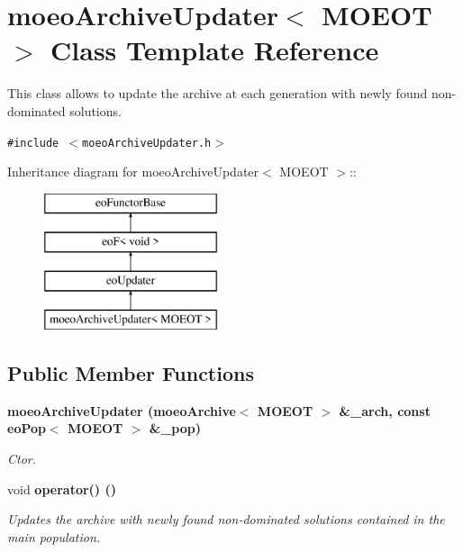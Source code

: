 \section{moeo\-Archive\-Updater$<$ MOEOT $>$ Class Template Reference}
\label{classmoeoArchiveUpdater}
This class allows to update the archive at each generation with newly found non-dominated solutions.  


{\tt \#include $<$moeo\-Archive\-Updater.h$>$}

Inheritance diagram for moeo\-Archive\-Updater$<$ MOEOT $>$::\begin{figure}[H]
\begin{center}
\leavevmode
\includegraphics[height=4cm]{classmoeoArchiveUpdater}
\end{center}
\end{figure}
\subsection*{Public Member Functions}
\begin{CompactItemize}
\item 
\bf{moeo\-Archive\-Updater} (\bf{moeo\-Archive}$<$ MOEOT $>$ \&\_\-arch, const \bf{eo\-Pop}$<$ MOEOT $>$ \&\_\-pop)
\begin{CompactList}\small\item\em Ctor. \item\end{CompactList}\item 
void \bf{operator()} ()\label{classmoeoArchiveUpdater_3d72137dce51d0d4f0cc7207be42878a}

\begin{CompactList}\small\item\em Updates the archive with newly found non-dominated solutions contained in the main population. \item\end{CompactList}\end{CompactItemize}
